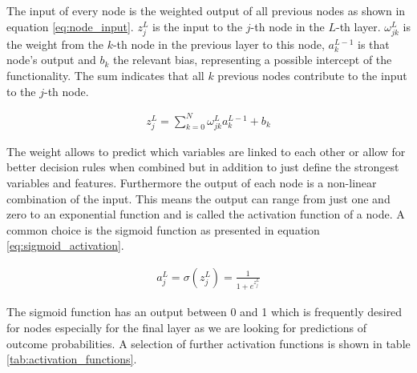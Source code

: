 The input of every node is the weighted output of all previous nodes as shown in equation \eqref{eq:node_input}. $z_j^L$ is the input to the $j$-th node in the $L$-th layer. $\omega_{jk}^L$ is the weight from the $k$-th node in the previous layer to this node, $a_k^{L-1}$ is that node's output and $b_k$ the relevant bias, representing a possible intercept of the functionality. The sum indicates that all $k$ previous nodes contribute to the input to the $j$-th node.

\begin{align}
    z_j^L = \sum_{k=0}^{N} \omega_{jk}^L a_k^{L-1} + b_k
    \label{eq:node_input}
\end{align}


The weight allows to predict which variables are linked to each other or allow for better decision rules when combined but in addition to just define the strongest variables and features. Furthermore the output of each node is a non-linear combination of the input. This means the output can range from just one and zero to an exponential function and is called the activation function of a node. A common choice is the sigmoid function as presented in equation \eqref{eq:sigmoid_activation}.~\cite{chollet2015keras}

\begin{align}
    a_j^L = \sigma ( z_j^L ) = \frac{1}{1 + e^{z_j^L}}
    \label{eq:sigmoid_activation}
\end{align}

The sigmoid function has an output between \num{0} and \num{1} which is frequently desired for nodes especially for the final layer as we are looking for predictions of outcome probabilities. A selection of further activation functions is shown in table \ref{tab:activation_functions}.

